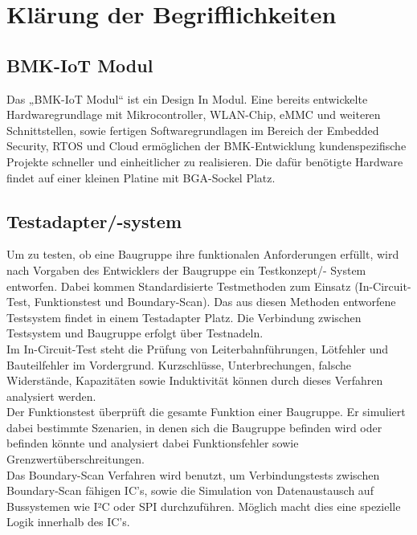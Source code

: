 \documentclass[a4paper,11pt]{scrartcl}
\begin{document}
\section{Klärung der Begrifflichkeiten}


\subsection{BMK-IoT Modul}
Das „BMK-IoT Modul“ ist ein Design In Modul. Eine bereits entwickelte Hardwaregrundlage mit Mikrocontroller, WLAN-Chip, eMMC und weiteren Schnittstellen, sowie fertigen Softwaregrundlagen im Bereich der Embedded Security, RTOS und Cloud ermöglichen der BMK-Entwicklung kundenspezifische Projekte schneller und einheitlicher zu realisieren.
Die dafür benötigte Hardware findet auf einer kleinen Platine mit BGA-Sockel Platz. 


\subsection{Testadapter/-system}

Um zu testen, ob eine Baugruppe ihre funktionalen Anforderungen erfüllt, wird nach Vorgaben des Entwicklers der Baugruppe ein Testkonzept/- System entworfen. Dabei kommen Standardisierte Testmethoden zum Einsatz (In-Circuit-Test, Funktionstest und Boundary-Scan). Das aus diesen Methoden entworfene Testsystem findet in einem Testadapter Platz. Die Verbindung zwischen Testsystem und Baugruppe erfolgt über Testnadeln.
\\
Im In-Circuit-Test steht die Prüfung von Leiterbahnführungen, Lötfehler und Bauteilfehler im Vordergrund. Kurzschlüsse, Unterbrechungen, falsche Widerstände, Kapazitäten sowie Induktivität können durch dieses Verfahren analysiert werden.
\\
Der Funktionstest überprüft die gesamte Funktion einer Baugruppe. Er simuliert dabei bestimmte Szenarien, in denen sich die Baugruppe befinden wird oder befinden könnte und analysiert dabei Funktionsfehler sowie Grenzwertüberschreitungen.
\\
Das Boundary-Scan Verfahren wird benutzt, um Verbindungstests zwischen Boundary-Scan fähigen IC’s, sowie die Simulation von Datenaustausch auf Bussystemen wie I²C oder SPI durchzuführen. Möglich macht dies eine spezielle Logik innerhalb des IC’s.
\end{document}
